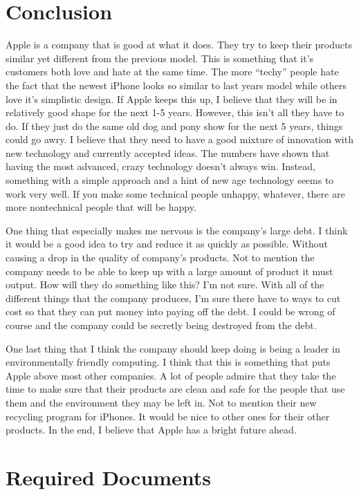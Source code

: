 \documentclass[12pt,a4paper,titlepage]{article}
\begin{document}
\section{Conclusion}
Apple is a company that is good at what it does. They try to keep their products
similar yet different from the previous model. This is something that it's
customers both love and hate at the same time. The more ``techy'' people hate
the fact that the newest iPhone looks so similar to last years model while
others love it's simplistic design. If Apple keeps this up, I believe that they
will be in relatively good shape for the next 1-5 years. However, this isn't all
they have to do. If they just do the same old dog and pony show for the next 5
years, things could go awry. I believe that they need to have a good mixture of
innovation with new technology and currently accepted ideas. The numbers have
shown that having the most advanced, crazy technology doesn't always
win. Instead, something with a simple approach and a hint of new age technology
seems to work very well. If you make some technical people unhappy, whatever,
there are more nontechnical people that will be happy.

One thing that especially makes me nervous is the company's large debt. I think
it would be a good idea to try and reduce it as quickly as possible. Without
causing a drop in the quality of company's products. Not to mention the company
needs to be able to keep up with a large amount of product it must output. How
will they do something like this? I'm not sure. With all of the different things
that the company produces, I'm sure there have to ways to cut cost so that they
can put money into paying off the debt. I could be wrong of course and the
company could be secretly being destroyed from the debt.

One last thing that I think the company should keep doing is being a leader in
environmentally friendly computing. I think that this is something that puts
Apple above most other companies. A lot of people admire that they take the time
to make sure that their products are clean and safe for the people that use them
and the environment they may be left in. Not to mention their new recycling
program for iPhones. It would be nice to other ones for their other products. In
the end, I believe that Apple has a bright future ahead.

\newpage

\section{Required Documents}
\end{document}
